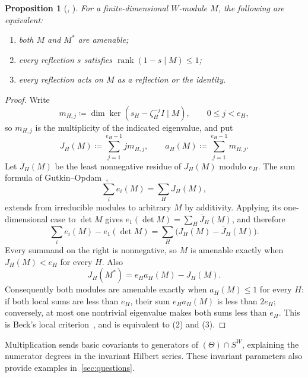 \documentclass[10pt,a4paper]{amsart}
\newcommand{\defeq}{\coloneqq}
\newtheorem{proposition}[theorem]{Proposition}
\theoremstyle{definition}
\begin{document}
\begin{proposition}[{\cite[Lemma 2.1]{Opdam}, \cite[Remark 1(i)]{Beck}}]
\label{a:prop:two-sided-amenability}
For a finite-dimensional $W$-module $M$, the following are equivalent:
\begin{enumerate}
\item both $M$ and $M^*$ are amenable;
\item every reflection $s$ satisfies $\operatorname{rank}(1-s\mid M)\leq1$;
\item every reflection acts on $M$ as a reflection or the identity.
\end{enumerate}
\end{proposition}
\begin{proof}
Write
\[
 m_{H,j}\defeq\dim\ker(s_H-\zeta_H^{-j}I\mid M),
 \qquad 0\leq j<e_H,
\]
so $m_{H,j}$ is the multiplicity of the indicated eigenvalue, and put
\[
 J_H(M)\defeq\sum_{j=1}^{e_H-1}j m_{H,j},\qquad
 a_H(M)\defeq\sum_{j=1}^{e_H-1}m_{H,j}.
\]
Let $\overline J_H(M)$ be the least nonnegative residue of $J_H(M)$
modulo $e_H$. The sum formula of Gutkin--Opdam~\cite[Lemma 2.1]{Opdam},
\[
 \sum_i e_i(M)=\sum_H J_H(M),
\]
extends from irreducible modules to arbitrary $M$ by additivity.
Applying its one-dimensional case to $\det M$ gives
$e_1(\det M)=\sum_H\overline J_H(M)$, and therefore
\[
 \sum_i e_i(M)-e_1(\det M)
 =\sum_H\bigl(J_H(M)-\overline J_H(M)\bigr).
\]
Every summand on the right is nonnegative, so $M$ is
amenable exactly when $J_H(M)<e_H$ for every $H$. Also
\[
 J_H(M^*)=e_Ha_H(M)-J_H(M).
\]
Consequently both modules are amenable exactly when $a_H(M)\leq1$
for every $H$: if both local sums are less than $e_H$, their sum
$e_Ha_H(M)$ is less than $2e_H$; conversely, at most one nontrivial
eigenvalue makes both sums less than $e_H$. This is Beck's local
criterion~\cite[Remark 1(i)]{Beck}, and is equivalent to (2) and (3).
\end{proof}

Multiplication sends basic covariants to generators of
$(\Theta)\cap S^W$, explaining the numerator degrees in the invariant
Hilbert series. These invariant parameters also provide examples
in~\cref{sec:questions}.
\end{document}
